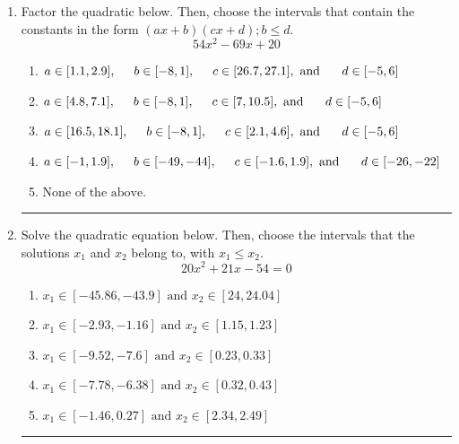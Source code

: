 \documentclass[14pt]{extbook}
\newcommand{\litem}[1]{\item#1\hspace*{-1cm}\rule{\textwidth}{0.4pt}}
\begin{document}
\begin{enumerate}
{\begin{enumerate}[label=\Alph*.]
\end{enumerate} }
\litem{
Factor the quadratic below. Then, choose the intervals that contain the constants in the form $(ax+b)(cx+d); b \leq d.$\[ 54x^{2} -69 x + 20 \]\begin{enumerate}[label=\Alph*.]
\item \( a \in [1.1, 2.9], \hspace*{5mm} b \in [-8, 1], \hspace*{5mm} c \in [26.7, 27.1], \text{ and } \hspace*{5mm} d \in [-5, 6] \)
\item \( a \in [4.8, 7.1], \hspace*{5mm} b \in [-8, 1], \hspace*{5mm} c \in [7, 10.5], \text{ and } \hspace*{5mm} d \in [-5, 6] \)
\item \( a \in [16.5, 18.1], \hspace*{5mm} b \in [-8, 1], \hspace*{5mm} c \in [2.1, 4.6], \text{ and } \hspace*{5mm} d \in [-5, 6] \)
\item \( a \in [-1, 1.9], \hspace*{5mm} b \in [-49, -44], \hspace*{5mm} c \in [-1.6, 1.9], \text{ and } \hspace*{5mm} d \in [-26, -22] \)
\item \( \text{None of the above.} \)

\end{enumerate} }
\litem{
Solve the quadratic equation below. Then, choose the intervals that the solutions $x_1$ and $x_2$ belong to, with $x_1 \leq x_2$.\[ 20x^{2} +21 x -54 = 0 \]\begin{enumerate}[label=\Alph*.]
\item \( x_1 \in [-45.86, -43.9] \text{ and } x_2 \in [24, 24.04] \)
\item \( x_1 \in [-2.93, -1.16] \text{ and } x_2 \in [1.15, 1.23] \)
\item \( x_1 \in [-9.52, -7.6] \text{ and } x_2 \in [0.23, 0.33] \)
\item \( x_1 \in [-7.78, -6.38] \text{ and } x_2 \in [0.32, 0.43] \)
\item \( x_1 \in [-1.46, 0.27] \text{ and } x_2 \in [2.34, 2.49] \)


\end{enumerate}}
\end{enumerate}
\end{document}

